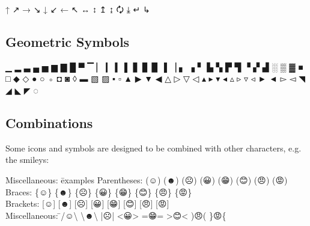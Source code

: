 ↑ ↗ → ↘ ↓ ↙ ← ↖ ↔ ↕ ↥ ↨ 🗘 ⤓ ↵ ↳

\subsection{Geometric Symbols}

▁ ▂ ▃ ▄ ▅ ▆ ▇ █ ▀ ▔ ▏ ▎ ▍ ▌ ▋ ▊ ▉ ▐ ▕ ▖ ▗ ▘ ▙ ▚ ▛ ▜ ▝ ▞ ▟ ░ ▒ ▓ ■ □ ◆ ◇ ● ○ ◦ ◘ ◙ ◊ ▬ ▧ ▨ ▪ ▫ ▲ ▶ ▼ ◀ △ ▷ ▽ ◁ ▴ ▸ ▾ ◂ ▵ ▹ ▿ ◃ ► ◄ ▻ ◅ ◥ ◢ ◣ ◤ ◌

\subsection{Combinations}

Some icons and symbols are designed to be combined with other characters, e.g. the smileys:

\begin{tabbing}
	Miscellaneous: \= examples \kill
	Parentheses: \> \large (☺) (☻) (☹) (😀) (😁) (😊) (😠) (😡) \\
	Braces:      \> \large \{☺\} \{☻\} \{☹\} \{😀\} \{😁\} \{😊\} \{😠\} \{😡\} \\
	Brackets:    \> \large [☺] [☻] [☹] [😀] [😁] [😊] [😠] [😡] \\
	Miscellaneous: \= \large /☺\textbackslash{} \textbackslash ☻\textbackslash{} |☹| <😀> =😁=  >😊< )😠( \}😡\{ \\
\end{tabbing}
